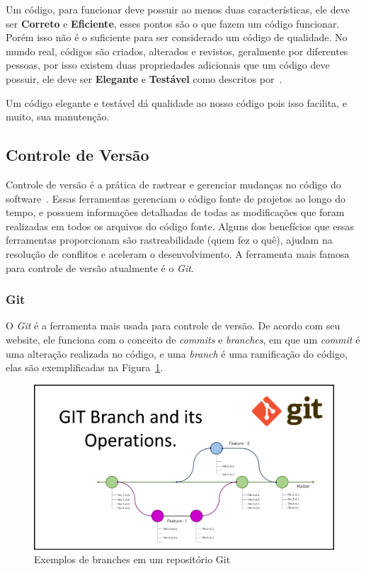 \documentclass[12pt]{article}
\begin{document}
Um código, para funcionar deve possuir ao menos duas características, ele deve ser \textbf{Correto} e \textbf{Eficiente},
esses pontos são o que fazem um código funcionar. Porém isso não é o suficiente para ser considerado
um código de qualidade. No mundo real, códigos são criados, alterados e revistos, geralmente por diferentes pessoas,
por isso existem duas propriedades adicionais que um código deve possuir, ele deve ser \textbf{Elegante} e \textbf{Testável}
como descritos por~\cite{Levy04}.

Um código elegante e testável dá qualidade ao nosso código pois isso facilita, e muito, sua manutenção.

\subsection{Controle de Versão}

Controle de versão é a prática de rastrear e gerenciar mudanças no código do software~\cite{attlasianGit}.
Essas ferramentas gerenciam o código fonte de projetos ao longo do tempo, e possuem informações detalhadas
de todas as modificações que foram realizadas em todos os arquivos do código fonte.
Alguns dos benefícios que essas ferramentas proporcionam são rastreabilidade (quem fez o quê),
ajudam na resolução de conflitos e aceleram o desenvolvimento. A ferramenta mais famosa para controle de
versão atualmente é o \textit{Git}.

\subsubsection{Git}

O \textit{Git} é a ferramenta mais usada para controle de versão. De acordo com seu website, ele
funciona com o conceito de \textit{commits} e \textit{branches}, em que um \textit{commit}
é uma alteração realizada no código, e uma \textit{branch} é uma ramificação do código, elas são
exemplificadas na Figura~\ref{fig:git-branches}.

\begin{figure}[H]
  \centering
  \includegraphics[width=1\textwidth]{git/git-branches.png}
  \caption{Exemplos de branches em um repositório Git}\label{fig:git-branches}
\end{figure}
\end{document}
